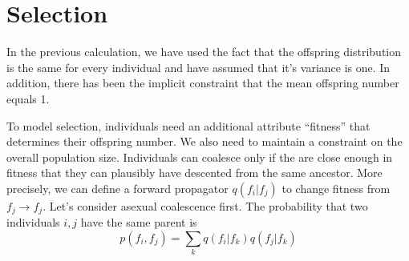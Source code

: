 \documentclass{article}
\begin{document}
\section*{Selection}
In the previous calculation, we have used the fact that the offspring
distribution is the same for every individual and have assumed that
it's variance is one. In addition, there has been the implicit
constraint that the mean offspring number equals 1.

To model selection, individuals need an additional attribute
``fitness'' that determines their offspring number. We also need to
maintain a constraint on the overall population size. Individuals can
coalesce only if the are close enough in fitness that they can
plausibly have descented from the same ancestor. More precisely, we
can define a forward propagator $q(f_i|f_j)$ to change fitness from
$f_j\to f_j$. Let's consider asexual coalescence first. The
probability that two individuals $i,j$ have the same parent is
\begin{equation}
  p(f_i,f_j) = \sum_k q(f_i|f_k)q(f_j|f_k)
\end{equation}
\end{document}
